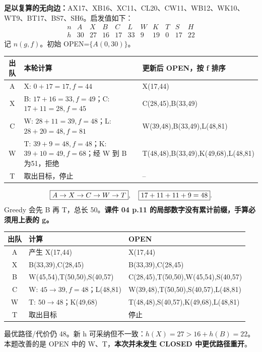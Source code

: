 \textbf{足以复算的无向边：}AX17、XB16、XC11、CL20、CW11、WB12、WK10、WT9、BT17、BS7、SH6。启发值如下：
\[
\begin{array}{c|rrrrrrrrrr}n&A&X&B&C&L&W&K&T&S&H\\\hline
h&30&27&16&17&33&9&19&0&17&22\end{array}
\]
记 $n(g,f)$。初始 OPEN=$\{A(0,30)\}$。
\begin{center}\small\par\noindent\begin{tabularx}{\textwidth}{cY Y}\toprule
出队&本轮计算&更新后 OPEN，按 f 排序\\\midrule
A&X: $0+17=17,f=44$&X(17,44)\\
X&B: $17+16=33,f=49$；C: $17+11=28,f=45$&C(28,45),B(33,49)\\
C&W: $28+11=39,f=48$；L: $28+20=48,f=81$&W(39,48),B(33,49),L(48,81)\\
W&T: $39+9=48,f=48$；K: $39+10=49,f=68$；经 W 到 B 为51，拒绝&T(48,48),B(33,49),K(49,68),L(48,81)\\
T&取出目标，停止&--\\\bottomrule\end{tabularx}\par\end{center}
\[
\boxed{A\to X\to C\to W\to T},\quad\boxed{17+11+11+9=48}.
\]
Greedy 会先 B 再 T，总长 50。\textbf{课件 04 p.11 的局部数字没有累计前缀，手算必须用上表的 g。}

\begin{center}\small\par\noindent\begin{tabularx}{\textwidth}{cY Y}\toprule
出队&计算&OPEN\\\midrule
A&产生 X(17,44)&X(17,44)\\
X&B(33,39),C(28,45)&B(33,39),C(28,45)\\
B&W(45,54),T(50,50),S(40,57)&C(28,45),T(50,50),W(45,54),S(40,57)\\
C&W: $45\to39,f=48$；L(48,81)&W(39,48),T(50,50),S(40,57),L(48,81)\\
W&T: $50\to48$；K(49,68)&T(48,48),S(40,57),K(49,68),L(48,81)\\
T&取出目标&停止\\\bottomrule\end{tabularx}\par\end{center}
最优路径/代价仍 48。新 h 可采纳但不一致：$h(X)=27>16+h(B)=22$。本题改善的是 OPEN 中的 W、T，\textbf{本次并未发生 CLOSED 中更优路径重开}。

